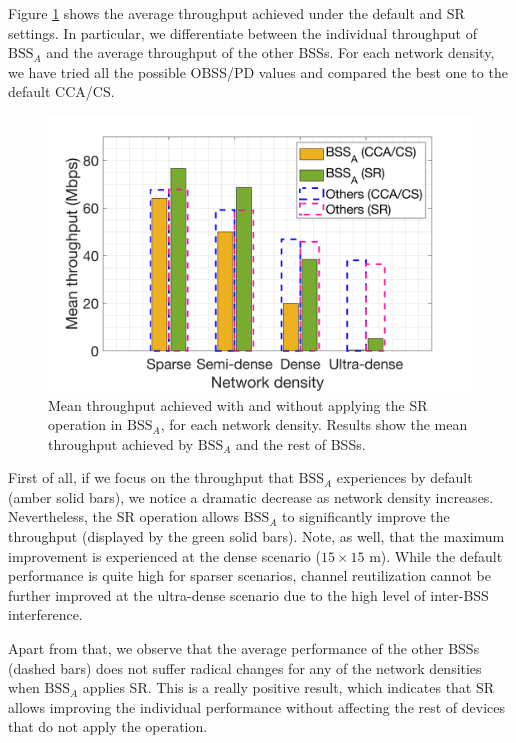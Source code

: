 \documentclass{ieeeaccess}
\begin{document}
Figure \ref{fig:SIM_2_1} shows the average throughput achieved under the default and SR settings. In particular, we differentiate between the individual throughput of $\text{BSS}_A$ and the average throughput of the other BSSs. For each network density, we have tried all the possible OBSS/PD values and compared the best one to the default CCA/CS.

\begin{figure}[ht!]
	\centering		
	\includegraphics[width=.9\columnwidth]{SIM_2_1}
	\caption{Mean throughput achieved with and without applying the SR operation in $\text{BSS}_A$, for each network density. Results show the mean throughput achieved by $\text{BSS}_A$ and the rest of BSSs.}
	\label{fig:SIM_2_1}
\end{figure}

First of all, if we focus on the throughput that $\text{BSS}_A$ experiences by default (amber solid bars), we notice a dramatic decrease as network density increases. Nevertheless, the SR operation allows $\text{BSS}_A$ to significantly improve the throughput (displayed by the green solid bars). Note, as well, that the maximum improvement is experienced at the dense scenario ($15\times15$ m). While the default performance is quite high for sparser scenarios, channel reutilization cannot be further improved at the ultra-dense scenario due to the high level of inter-BSS interference.

Apart from that, we observe that the average performance of the other BSSs (dashed bars) does not suffer radical changes for any of the network densities when $\text{BSS}_A$ applies SR. This is a really positive result, which indicates that SR allows improving the individual performance without affecting the rest of devices that do not apply the operation.
\end{document}
